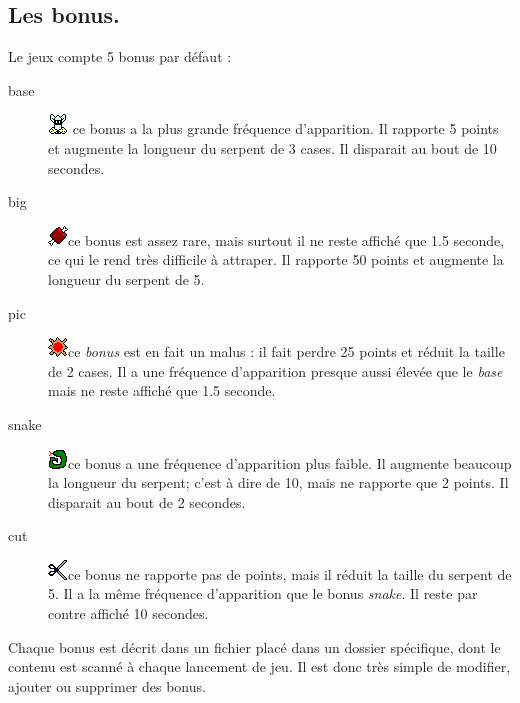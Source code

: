 \documentclass{article}
\begin{document}
\subsection{Les bonus.} \label{bonus}
Le jeux compte 5 bonus par défaut :\begin{description}
	\item[base] \includegraphics{img/base.png} ce bonus a la plus grande fréquence d'apparition. Il rapporte 5 points et augmente la longueur du serpent de 3 cases. Il disparait au bout de 10 secondes.
	\item[big]  \includegraphics{img/big.png}ce bonus est assez rare, mais surtout il ne reste affiché que 1.5 seconde, ce qui le rend très difficile à attraper. Il rapporte 50 points et augmente la longueur du serpent de 5.
	\item[pic]  \includegraphics{img/pic.png}ce \emph{bonus} est en fait un malus : il fait perdre 25 points et réduit la taille de 2 cases. Il a une fréquence d'apparition presque aussi élevée que le \emph{base} mais ne reste affiché que 1.5 seconde.
	\item[snake]  \includegraphics{img/snake.png}ce bonus a une fréquence d'apparition plus faible. Il augmente beaucoup la longueur du serpent; c'est à dire de 10, mais ne rapporte que 2 points. Il disparait au bout de 2 secondes.
	\item[cut]  \includegraphics{img/cut.png}ce bonus ne rapporte pas de points, mais il réduit la taille du serpent de 5. Il a la même fréquence d'apparition que le bonus \emph{snake}. Il reste par contre affiché 10 secondes.
\end{description}

Chaque bonus est décrit dans un fichier placé dans un dossier spécifique, dont le contenu est scanné à chaque lancement de jeu. Il est donc très simple de modifier, ajouter ou supprimer des bonus.
\end{document}

